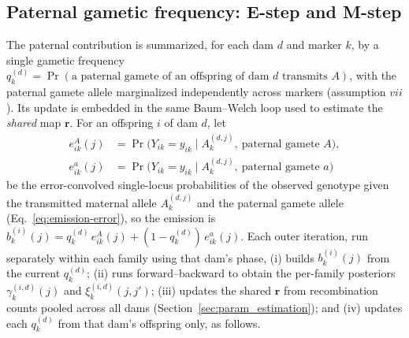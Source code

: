 \documentclass[11pt]{article}
\begin{document}
\subsection{Paternal gametic frequency: E-step and M-step}  \label{sec:par_cont}
The paternal contribution is summarized, for each dam \(d\) and marker \(k\), by a single gametic
frequency \(q_k^{(d)}=\Pr(\text{a paternal gamete of an offspring of dam }d\text{ transmits }A)\),
with the paternal gamete allele marginalized independently across markers (assumption $vii$). Its
update is embedded in the same Baum--Welch loop used to estimate the \emph{shared} map
\(\mathbf r\). For an offspring \(i\) of dam \(d\), let
\[
\begin{aligned}
e^{A}_{ik}(j)&=\Pr\!\big(Y_{ik}=y_{ik}\mid A_k^{(d,j)},\ \text{paternal gamete }A\big),\\
e^{a}_{ik}(j)&=\Pr\!\big(Y_{ik}=y_{ik}\mid A_k^{(d,j)},\ \text{paternal gamete }a\big)
\end{aligned}
\]
be the error-convolved single-locus probabilities of the observed genotype given the transmitted
maternal allele \(A_k^{(d,j)}\) and the paternal gamete allele (Eq.~\eqref{eq:emission-error}), so
the emission is \(b_k^{(i)}(j)=q_k^{(d)}\,e^{A}_{ik}(j)+(1-q_k^{(d)})\,e^{a}_{ik}(j)\). Each outer
iteration, run separately within each family using that dam's phase, (i) builds \(b_k^{(i)}(j)\)
from the current \(q_k^{(d)}\); (ii) runs forward--backward to obtain the per-family posteriors
\(\gamma_k^{(i,d)}(j)\) and \(\xi_k^{(i,d)}(j,j')\); (iii) updates the shared \(\mathbf r\) from
recombination counts pooled across all dams (Section~\ref{sec:param_estimation}); and (iv) updates
each \(q_k^{(d)}\) from that dam's offspring only, as follows.
\end{document}

